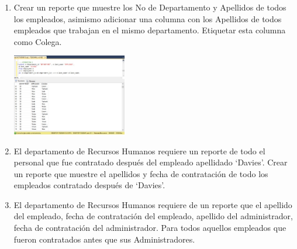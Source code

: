 \begin{enumerate}[1.]
	\item Crear un reporte que muestre los No de Departamento y Apellidos de todos los empleados, asimismo adicionar una columna con los Apellidos de todos empleados que trabajan en el mismo departamento. Etiquetar esta columna como Colega.
\begin{center}
	\includegraphics[width=5cm]{./Imagenes/8ejer6} 
	\end{center}

	\item El departamento de Recursos Humanos requiere un reporte de todo el personal que fue contratado después del empleado apellidado ‘Davies’. Crear un reporte que muestre el apellidos y fecha de contrataci\'on de todo los empleados contratado después de ‘Davies’.
	\item El departamento de Recursos Humanos requiere de un reporte que el apellido del empleado, fecha de contrataci\'on del empleado, apellido del administrador, fecha de contratación del administrador. Para todos aquellos empleados que fueron contratados antes que sus Administradores.
\end{enumerate}

